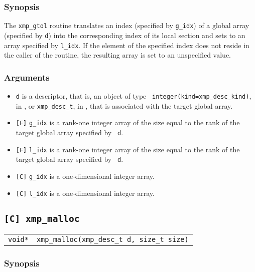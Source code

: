 \subsubsection*{Synopsis}

The {\tt xmp\_gtol} routine translates an index (specified by
{\tt g\_idx}) of a global array (specified by {\tt d}) into the
corresponding index of its local section and sets to an array specified
by {\tt l\_idx}. If the element of the specified index does not reside
in the caller of the routine, the resulting array is set to an
unspecified value.

\subsubsection*{Arguments}

\begin{itemize}
 \item {\tt d} is a descriptor, that is, an object of type {\tt
       integer(kind=xmp\_desc\_kind)}, in {\XMP}, or {\tt xmp\_desc\_t},
       in {\XMPC}, that is associated with the target global array.
 \item \verb![F]! {\tt g\_idx} is a rank-one integer array of the size
       equal to the rank of the target global array specified by {\tt
       d}.
 \item \verb![F]! {\tt l\_idx} is a rank-one integer array of the size
       equal to the rank of the target global array specified by {\tt
       d}.
 \item \verb![C]! {\tt g\_idx} is a one-dimensional integer array.
 \item \verb![C]! {\tt l\_idx} is a one-dimensional integer array.
\end{itemize}


\subsection{\tt [C] xmp\_malloc}
\label{subsec: xmp_malloc}

\begin{tabular}{ll}

{\tt void*} & {\tt xmp\_malloc(xmp\_desc\_t d, size\_t size)}

\end{tabular}

\subsubsection*{Synopsis}

